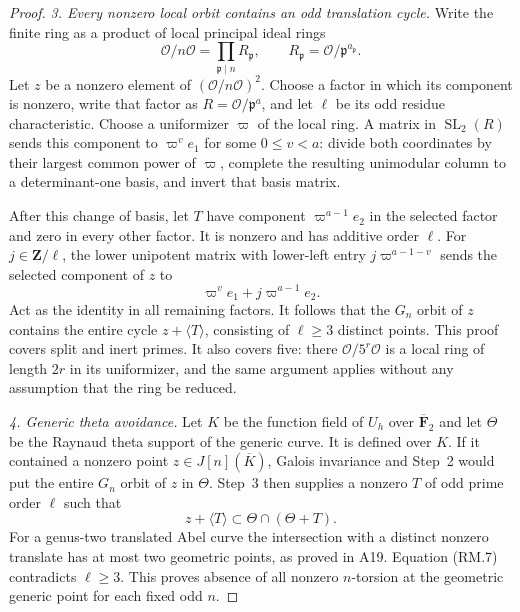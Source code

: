 \documentclass[11pt,a4paper]{article}
\begin{document}
\begin{proof}
\emph{3. Every nonzero local orbit contains an odd translation cycle.}
Write the finite ring as a product of local principal ideal rings
\[
 \mathcal O/n\mathcal O=\prod_{\mathfrak p\mid n}
                 R_{\mathfrak p},\qquad
 R_{\mathfrak p}=\mathcal O/\mathfrak p^{a_{\mathfrak p}}.
                                                               \tag{RM.5}
\]
Let $z$ be a nonzero element of $(\mathcal O/n\mathcal O)^2$.
Choose a factor in which its component is nonzero, write that
factor as $R=\mathcal O/\mathfrak p^a$, and let $\ell$ be its
odd residue characteristic.  Choose a uniformizer $\varpi$ of
the local ring.  A matrix in $\operatorname{SL}_2(R)$ sends
this component to $\varpi^v e_1$ for some $0\leq v<a$:
divide both coordinates by their largest common power of
$\varpi$, complete the resulting unimodular column to a
determinant-one basis, and invert that basis matrix.

After this change of basis, let $T$ have component
$\varpi^{a-1}e_2$ in the selected factor and zero in every
other factor.  It is nonzero and has additive order $\ell$.
For $j\in\mathbf Z/\ell$, the lower unipotent matrix with
lower-left entry $j\varpi^{a-1-v}$ sends the selected
component of $z$ to
\[
                    \varpi^v e_1+j\varpi^{a-1}e_2.             \tag{RM.6}
\]
Act as the identity in all remaining factors.  It follows that
the $G_n$ orbit of $z$ contains the entire cycle
$z+\langle T\rangle$, consisting of $\ell\geq3$ distinct points.
This proof covers split and inert primes.  It also covers five:
there $\mathcal O/5^r\mathcal O$ is a local ring of length
$2r$ in its uniformizer, and the same argument applies without
any assumption that the ring be reduced.

\emph{4. Generic theta avoidance.}
Let $K$ be the function field of $U_h$ over
$\overline{\mathbf F}_2$ and let $\Theta$ be the Raynaud theta
support of the generic curve.  It is defined over $K$.
If it contained a nonzero point $z\in J[n](\overline K)$,
Galois invariance and Step~2 would put the entire $G_n$ orbit
of $z$ in $\Theta$.  Step~3 then supplies a nonzero $T$ of
odd prime order $\ell$ such that
\[
                   z+\langle T\rangle
                         \subset\Theta\cap(\Theta+T).         \tag{RM.7}
\]
For a genus-two translated Abel curve the intersection with
a distinct nonzero translate has at most two geometric points,
as proved in A19.  Equation (RM.7) contradicts $\ell\geq3$.
This proves absence of all nonzero $n$-torsion at the geometric
generic point for each fixed odd $n$.


\end{proof}
\end{document}

